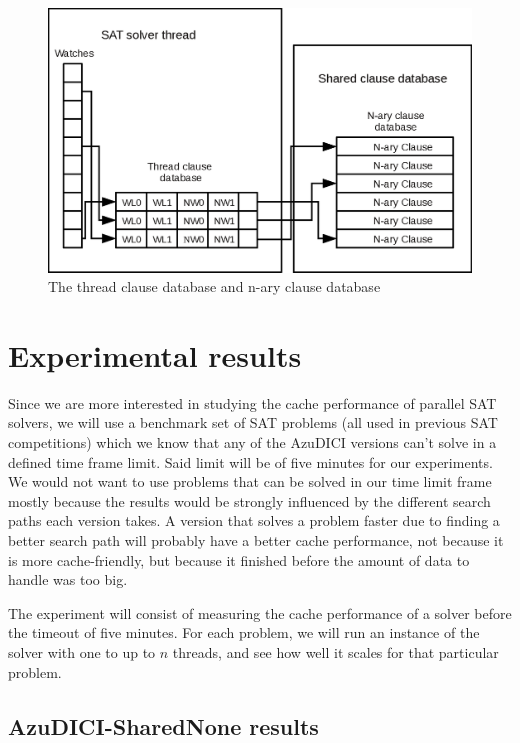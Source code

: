 \documentclass[12pt]{diicc}
\begin{document}
\begin{figure}[tp]
  \centering
  \includegraphics[scale=0.6]{AzuDICI_design}
  \caption{The thread clause database and n-ary clause database}
  \label{fig:azu design}
\end{figure}


\section{Experimental results} 

Since we are more interested in studying the cache performance of parallel SAT solvers, we will use a benchmark set of SAT problems (all used in previous SAT competitions) which we know that any of the AzuDICI versions can't solve in a defined time frame limit. Said limit will be of five minutes for our experiments. We would not want to use problems that can be solved in our time limit frame mostly because the results would be strongly influenced by the different search paths each version takes. A version that solves a problem faster due to finding a better search path will probably have a better cache performance, not because it is more cache-friendly, but because it finished before the amount of data to handle was too big.

The experiment will consist of measuring the cache performance of a solver before the timeout of five minutes. For each problem, we will run an instance of the solver with one to up to $n$ threads, and see how well it scales for that particular problem.

\subsection{AzuDICI-SharedNone results}
\end{document}
